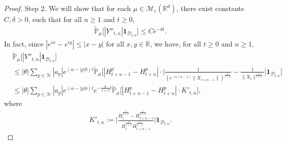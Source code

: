 \documentclass[12pt,a4paper]{amsart}
\theoremstyle{plain}
\theoremstyle{definition}
\numberwithin{equation}{section}
\begin{document}
\begin{proof}
\begin{comment}
    In fact, let $C_1$ be the constant in  Lemma 2.9 corresponding to this fixed $\gamma$ and $C_2$ be the constant in Lemma 2.10.
    By Chebyshev's inequality, there exists $C>0$ such that for all $n \geq 1$ and $t\geq 0$,
\begin{align}
\label{eq: prob of Dtkc11}
    &\mathbb{\tilde{P}}_{\mu}(\mathcal{D}_{t,n}^c)
    \\&\leq \mathbb{\tilde{P}}_{\mu}(|H_t-H_{t+n-1}| > e^{-\eta_0 t})+\mathbb{\tilde{P}}_{\mu}(H_{t}\leq 2e^{-\eta_1 t}),
    \\&\leq \mathbb{P}_{\mu}(D^c)^{-1}e^{\eta_0 t}\mathbb{P}_{\mu}[|H_t-H_{t+n-1}|]+\mathbb{\tilde{P}}(H_t\leq 2e^{-\eta_1 t})
    \\&\leq \mathbb{P}_{\mu}(D^c)^{-1}  e^{\eta_0 t}\|H_t - H_{t+n-1}\|_{\mathbb P_\mu; 1+\gamma}+\mathbb{\tilde{P}}(H_{t}\leq 2e^{-\eta_1t})
    \\&\leq C_1  \mathbb{P}_{\mu}(D^c)^{-1}  e^{-(\frac{\alpha \gamma}{1+\gamma} - \eta_0)t}+C_2 e^{-\eta_1\beta t}.
\end{align}
    This implies the desired result in this step, since $|Y_{t,k}| \leq 2$ a.s..
\end{comment}

    Step 2. We will show that for each $\mu \in \mathcal{M}_c(\mathbb{R}^d)$, there exist constants $C,\delta > 0$, such that for all $n\geq 1$ and $t\geq 0$,
\begin{align}
\label{thm12211}
     \mathbb{\tilde{P}}_{\mu}\big[|Y''_{t,n}|\mathbf{1}_{\mathcal{D}_{t,n}}\big]\leq Ce^{-\delta t}.
\end{align}
    In fact, since $|e^{ix}-e^{iy}|\leq|x-y|$ for all $x,y\in \mathbb R$, we have, for all $t \geq 0$ and $n\geq 1$,
    \begin{align}\label{large: used next}
        &\tilde{\mathbb{P}}_{\mu}\big[|Y''_{t,n}|\mathbf{1}_{\mathcal{D}_{t,n}}\big]\\
        &\leq |\theta|\sum_{p\in\mathcal{N}}|a_p|e^{(\alpha-|p|b)t}\tilde{\mathbb{P}}_{\mu}\Big[|H_{t+n-1}^p-H_{t+n}^p|\cdot\Big|\frac{1}{(e^{-\alpha(n-1)}\|X_{t+n-1}\|)^{\frac{1}{1+\beta}}}-\frac{1}{\|X_t\|^{\frac{1}{1+\beta}}}\Big|\mathbf{1}_{\mathcal{D}_{t,n}}\Big]\\
        &\leq |\theta|\sum_{p\in\mathcal{N}}|a_p|e^{(\alpha-|p|b)t}e^{-\frac{\alpha}{1+\beta}t}\tilde{\mathbb{P}}_{\mu}\Big[|H_{t+n-1}^p-H_{t+n}^p|\cdot K'_{t,n}\Big],
    \end{align}
    where
    \begin{align}
        K'_{t,n}
    :=\Big|\frac{H_t^{\frac{1}{1+\beta}}-H_{t+n-1}^{\frac{1}{1+\beta}}}{H_t^{\frac{1}{1+\beta}}H_{t+n-1}^{\frac{1}{1+\beta}}}\Big|\mathbf{1}_{\mathcal{D}_{t,n}}.
    \end{align}
\begin{comment}


\end{comment}
\end{proof}
\end{document}
